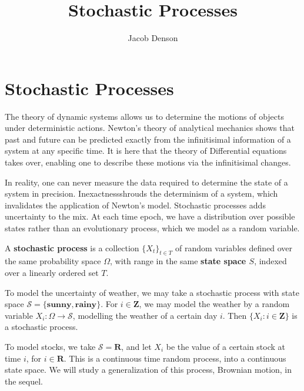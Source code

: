 

\title{Stochastic Processes}
\author{Jacob Denson}



\maketitle
\tableofcontents
{}

\chapter{Stochastic Processes}

The theory of dynamic systems allows us to determine the motions of objects under deterministic actions. Newton's theory of analytical mechanics shows that past and future can be predicted exactly from the infinitisimal information of a system at any specific time. It is here that the theory of Differential equations takes over, enabling one to describe these motions via the infinitisimal changes.

In reality, one can never measure the data required to determine the state of a system in precision. Inexactnessshrouds the determinism of a system, which invalidates the application of Newton's model. Stochastic processes adds uncertainty to the mix. At each time epoch, we have a distribution over possible states rather than an evolutionary process, which we model as a random variable.

\begin{definition}
    A {\bf stochastic process} is a collection $\{ X_t \}_{t \in T}$ of random variables defined over the same probability space $\Omega$, with range in the same {\bf state space $S$}, indexed over a linearly ordered set $T$.
\end{definition}

\begin{example}
    To model the uncertainty of weather, we may take a stochastic process with state space $\mathcal{S} = \{ \textbf{sunny}, \textbf{rainy} \}$. For $i \in \mathbf{Z}$, we may model the weather by a random variable $X_i : \Omega \to \mathcal{S}$, modelling the weather of a certain day $i$. Then $\{ X_i : i \in \mathbf{Z} \}$ is a stochastic process.
\end{example}

\begin{example}
    To model stocks, we take $\mathcal{S} = \mathbf{R}$, and let $X_i$ be the value of a certain stock at time $i$, for $i \in \mathbf{R}$. This is a continuous time random process, into a continuous state space. We will study a generalization of this process, Brownian motion, in the sequel.
\end{example}

